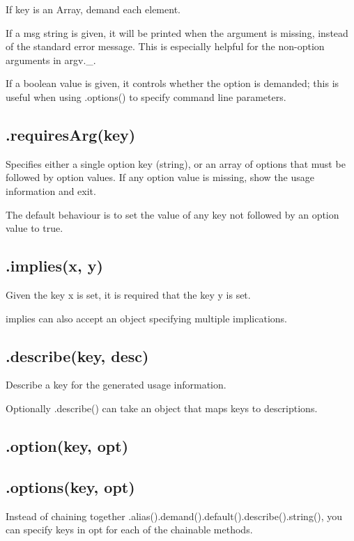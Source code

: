If {\ttfamily key} is an Array, demand each element.

If a {\ttfamily msg} string is given, it will be printed when the argument is missing, instead of the standard error message. This is especially helpful for the non-\/option arguments in {\ttfamily argv.\+\_\+}.

If a {\ttfamily boolean} value is given, it controls whether the option is demanded; this is useful when using {\ttfamily .options()} to specify command line parameters.

\subsection*{.requires\+Arg(key) }

Specifies either a single option key (string), or an array of options that must be followed by option values. If any option value is missing, show the usage information and exit.

The default behaviour is to set the value of any key not followed by an option value to {\ttfamily true}.

\subsection*{.implies(x, y) }

Given the key {\ttfamily x} is set, it is required that the key {\ttfamily y} is set.

implies can also accept an object specifying multiple implications.

\subsection*{.describe(key, desc) }

Describe a {\ttfamily key} for the generated usage information.

Optionally {\ttfamily .describe()} can take an object that maps keys to descriptions.

\subsection*{.option(key, opt) }

\subsection*{.options(key, opt) }

Instead of chaining together {\ttfamily .alias().demand().default().describe().string()}, you can specify keys in {\ttfamily opt} for each of the chainable methods.

